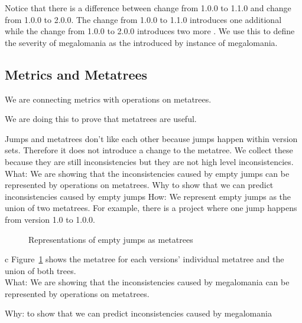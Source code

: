 \documentclass[conference]{IEEEtran}
\begin{document}
Notice that there is a difference between change from 1.0.0 to 1.1.0 and change from 1.0.0 to 2.0.0. 
The change from 1.0.0 to 1.1.0 introduces one additional \choice while the change from 1.0.0 to 2.0.0 introduces two more \choices.
We use this to define the severity of megalomania as the \numberextrachoices introduced by instance of megalomania.

\subsection{Metrics and Metatrees}

We are connecting metrics with operations on metatrees.

We are doing this to prove that metatrees are useful.

Jumps and metatrees don't like each other because jumps happen within version sets. 
Therefore it does not introduce a change to the metatree.
We collect these because they are still inconsistencies but they are not high level inconsistencies. \\

What: We are showing that the inconsistencies caused by empty jumps can be represented by operations on metatrees.
Why to show that we can predict inconsistencies caused by empty jumps
How: We represent empty jumps as the union of two metatrees. 
For example, there is a project where one jump happens from version 1.0 to 1.0.0. 


\begin{figure}
\begin{center}
 \begin{adjustbox}{width=.5\textwidth}

\end{adjustbox}
\end{center}
\caption{Representations of empty jumps as metatrees}
\label{fig:emptyJumpMeta}
\end{figure}
c
Figure~\ref{fig:emptyJumpMeta} shows the metatree for each versions' individual metatree and the union of both trees. \\

What:  We are showing that the inconsistencies caused by megalomania can be represented by operations on metatrees.

Why: to show that we can predict inconsistencies caused by megalomania
\end{document}
